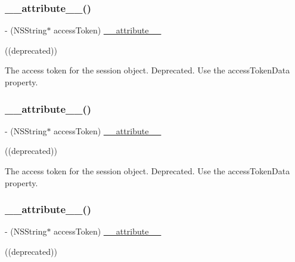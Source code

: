 \subsubsection{\texorpdfstring{\+\_\+\+\_\+attribute\+\_\+\+\_\+()}{\_\_attribute\_\_()}\hspace{0.1cm}{\footnotesize\ttfamily [3/25]}}
{\footnotesize\ttfamily -\/ (N\+S\+String$\ast$ access\+Token) \hyperlink{struct____attribute____}{\+\_\+\+\_\+attribute\+\_\+\+\_\+} \begin{DoxyParamCaption}\item[{((deprecated))}]{ }\end{DoxyParamCaption}}

The access token for the session object.  Deprecated. Use the {\ttfamily access\+Token\+Data} property. \mbox{\label{interfaceFBSession_a129a9e2b497ba201043bb82244156341}} 
\subsubsection{\texorpdfstring{\+\_\+\+\_\+attribute\+\_\+\+\_\+()}{\_\_attribute\_\_()}\hspace{0.1cm}{\footnotesize\ttfamily [4/25]}}
{\footnotesize\ttfamily -\/ (N\+S\+String$\ast$ access\+Token) \hyperlink{struct____attribute____}{\+\_\+\+\_\+attribute\+\_\+\+\_\+} \begin{DoxyParamCaption}\item[{((deprecated))}]{ }\end{DoxyParamCaption}}

The access token for the session object.  Deprecated. Use the {\ttfamily access\+Token\+Data} property. \mbox{\label{interfaceFBSession_a129a9e2b497ba201043bb82244156341}} 
\subsubsection{\texorpdfstring{\+\_\+\+\_\+attribute\+\_\+\+\_\+()}{\_\_attribute\_\_()}\hspace{0.1cm}{\footnotesize\ttfamily [5/25]}}
{\footnotesize\ttfamily -\/ (N\+S\+String$\ast$ access\+Token) \hyperlink{struct____attribute____}{\+\_\+\+\_\+attribute\+\_\+\+\_\+} \begin{DoxyParamCaption}\item[{((deprecated))}]{ }\end{DoxyParamCaption}}

